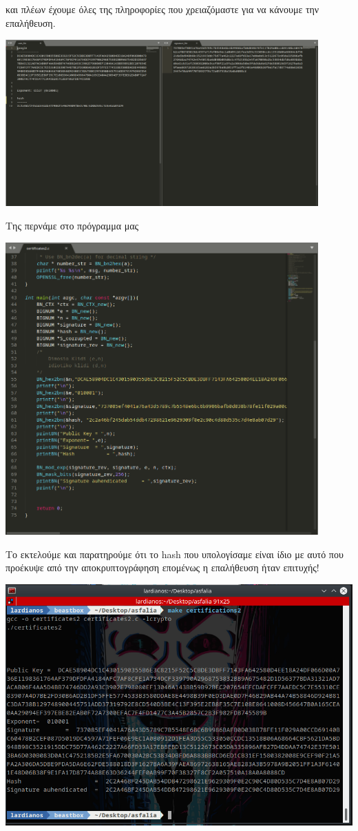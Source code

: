\noindent
και πλέων έχουμε όλες της πληροφορίες που χρειαζόμαστε για να κάνουμε την επαλήθευση.
\begin{center}
			\includegraphics[width=0.9\textwidth]{image/image36term9.PNG}		
\end{center}
\noindent
Της περνάμε στο πρόγραμμα μας 
\begin{center}
			\includegraphics[width=0.9\textwidth]{image/image36code.PNG}		
\end{center}
\pagebreak
\noindent
Το εκτελούμε και παρατηρούμε ότι το hash που υπολογίσαμε είναι ίδιο με αυτό 
που προέκυψε από την αποκρυπτογράφηση επομένως η επαλήθευση ήταν επιτυχής!
\begin{center}
			\includegraphics[width=1\textwidth]{image/image36term10.PNG}		
\end{center}
